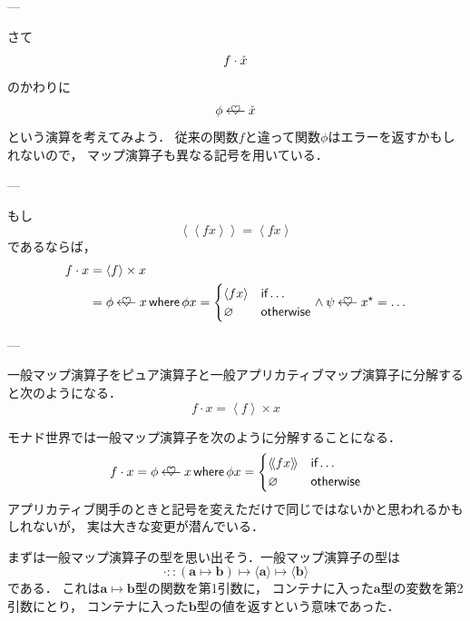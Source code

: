 \documentclass[a4paper]{jsbook}
\newcommand{\mList}[1]{{#1}^\mathrm{\star}}
\newcommand{\mathTypeParameter}[1]{\mathbf{#1}}
\newcommand{\mathContainerVar}[1]{\Check{#1}}
\newcommand{\mathPureWith}[1]{\left\langle#1\right\rangle}
\newcommand{\mathUnitWith}[1]{\left\langle\!\left\langle#1\right\rangle\!\right\rangle}
\newcommand{\mathPureNothing}{\varnothing}
\newcommand{\mathAnd}{\mathbin{\wedge}}
\newcommand{\mathApplicativeGeneralMap}{\mathbin{\times}}
\newcommand{\mathBind}{\mathbin{\ooalign{$\longleftarrow$\crcr\hss$\heartsuit$\hss}}}
\newcommand{\mathGeneralMap}{\mathbin{\cdot}}
\newcommand{\mathIn}{\mathrel{::}}
\newcommand{\mathMapsTo}{\mapsto}
\newcommand{\mathKeyword}[1]{\operatorname{\textsf{#1}}}
\newcommand{\mathIf}{\mathKeyword{if}}
\newcommand{\mathOtherwise}{\mathKeyword{otherwise}}
\newcommand{\mathWhere}{\mathKeyword{where}}
\newcommand{\mathMorph}[2]{#1\mathMapsTo#2}
\newcommand{\mathMorphII}[3]{#1\mathMapsTo#2\mathMapsTo#3}
\begin{document}
---

さて
\begin{equation}
  f\mathGeneralMap\mathContainerVar{x}
\end{equation}
のかわりに
\begin{equation}
  \phi\mathBind\mathContainerVar{x}
\end{equation}
という演算を考えてみよう．
従来の関数$f$と違って関数$\phi$はエラーを返すかもしれないので，
マップ演算子も異なる記号を用いている．

---

もし
\begin{equation}
\mathUnitWith{fx}=\mathPureWith{fx}
\end{equation}
であるならば，
\begin{align}
f\mathGeneralMap x&=\mathPureWith{f}\mathApplicativeGeneralMap x\\
&=\phi\mathBind x\mathWhere \phi x=\begin{cases}
\mathPureWith{fx}&\mathIf\dots\\
\mathPureNothing&\mathOtherwise
\end{cases}
\mathAnd
\psi\mathBind\mList{x}=\dots
\end{align}


---

一般マップ演算子をピュア演算子と一般アプリカティブマップ演算子に分解すると次のようになる．
\begin{equation}
f\mathGeneralMap x=\mathPureWith{f}\mathApplicativeGeneralMap x
\end{equation}

モナド世界では一般マップ演算子を次のように分解することになる．
\begin{equation}
f\mathGeneralMap x=\phi\mathBind x
\mathWhere
\phi x=\begin{cases}
\mathUnitWith{fx}&\mathIf\dots\\
\mathPureNothing&\mathOtherwise
\end{cases}
\end{equation}
アプリカティブ関手のときと記号を変えただけで同じではないかと思われるかもしれないが，
実は大きな変更が潜んでいる．

まずは一般マップ演算子の型を思い出そう．一般マップ演算子の型は
\begin{equation}
\mathGeneralMap
\mathIn{}\mathMorphII{(\mathMorph{\mathTypeParameter{a}}{\mathTypeParameter{b}})}{\langle\mathTypeParameter{a}\rangle}{\langle\mathTypeParameter{b}\rangle}
\end{equation}
である．
これは$\mathTypeParameter{a}\mapsto\mathTypeParameter{b}$型の関数を第1引数に，
コンテナに入った$\mathTypeParameter{a}$型の変数を第2引数にとり，
コンテナに入った$\mathTypeParameter{b}$型の値を返すという意味であった．
\end{document}
